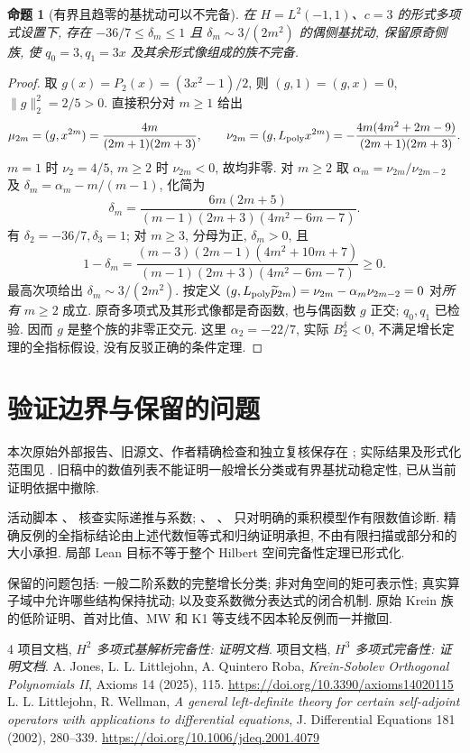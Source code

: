 \documentclass[UTF8]{ctexart}
\newtheorem{proposition}[theorem]{命题}
\begin{document}
\begin{proposition}[有界且趋零的基扰动可以不完备]\label{prop:perturb-counter}
在 $H=L^2(-1,1)$、$c=3$ 的形式多项式设置下,
存在 $-36/7\le\delta_m\le1$ 且
$\delta_m\sim3/(2m^2)$ 的偶侧基扰动, 保留原奇侧族,
使 $q_0=3,q_1=3x$ 及其余形式像组成的族不完备.
\end{proposition}
\begin{proof}
取 $g(x)=P_2(x)=(3x^2-1)/2$, 则
$(g,1)=(g,x)=0$, $\|g\|_2^2=2/5>0$.
直接积分对 $m\ge1$ 给出
\[
\mu_{2m}=(g,x^{2m})=\frac{4m}{(2m+1)(2m+3)},\qquad
\nu_{2m}=(g,L_{\rm poly}x^{2m})
=-\frac{4m(4m^2+2m-9)}{(2m+1)(2m+3)}.
\]
$m=1$ 时 $\nu_2=4/5$, $m\ge2$ 时 $\nu_{2m}<0$, 故均非零.
对 $m\ge2$ 取 $\alpha_m=\nu_{2m}/\nu_{2m-2}$
及 $\delta_m=\alpha_m-m/(m-1)$, 化简为
\[
\delta_m=\frac{6m(2m+5)}
{(m-1)(2m+3)(4m^2-6m-7)} .
\]
有 $\delta_2=-36/7,\delta_3=1$; 对 $m\ge3$, 分母为正, $\delta_m>0$, 且
\[
1-\delta_m=
\frac{(m-3)(2m-1)(4m^2+10m+7)}
{(m-1)(2m+3)(4m^2-6m-7)}\ge0.
\]
最高次项给出 $\delta_m\sim3/(2m^2)$.
按定义 $(g,L_{\rm poly}\widetilde p_{2m})
=\nu_{2m}-\alpha_m\nu_{2m-2}=0$ 对\emph{所有} $m\ge2$ 成立.
原奇多项式及其形式像都是奇函数, 也与偶函数 $g$ 正交;
$q_0,q_1$ 已检验. 因而 $g$ 是整个族的非零正交元.
这里 $\alpha_2=-22/7$, 实际 $B_2^\delta<0$,
不满足增长定理的全指标假设, 没有反驳正确的条件定理.
\end{proof}

\section{验证边界与保留的问题}

本次原始外部报告、旧源文、作者精确检查和独立复核保存在
;
实际结果及形式化范围见
.
旧稿中的数值列表不能证明一般增长分类或有界基扰动稳定性, 已从当前证明依据中撤除.

活动脚本 、
 核查实际递推与系数;
、
、
 只对明确的乘积模型作有限数值诊断.
精确反例的全指标结论由上述代数恒等式和归纳证明承担,
不由有限扫描或部分和的大小承担. 局部 Lean 目标不等于整个 Hilbert 空间完备性定理已形式化.

保留的问题包括: 一般二阶系数的完整增长分类; 非对角空间的矩可表示性;
真实算子域中允许哪些结构保持扰动; 以及变系数微分表达式的闭合机制.
原始 Krein 族的低阶证明、首对比值、MW 和 K1 等支线不因本轮反例而一并撤回.

\begin{thebibliography}{4}
 项目文档, \emph{$H^2$ 多项式基解析完备性: 证明文档}.
 项目文档, \emph{$H^3$ 多项式完备性: 证明文档}.
 A. Jones, L. L. Littlejohn, A. Quintero Roba,
\emph{Krein-Sobolev Orthogonal Polynomials II}, Axioms 14 (2025), 115.
\url{https://doi.org/10.3390/axioms14020115}
 L. L. Littlejohn, R. Wellman,
\emph{A general left-definite theory for certain self-adjoint operators with
applications to differential equations}, J. Differential Equations 181 (2002), 280--339.
\url{https://doi.org/10.1006/jdeq.2001.4079}
\end{thebibliography}
\end{document}
